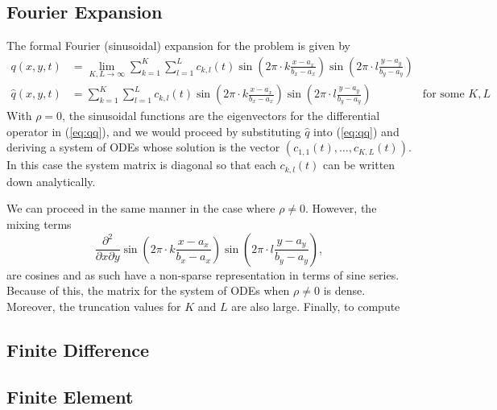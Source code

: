 \documentclass[10pt]{article}
\begin{document}
\subsection{Fourier Expansion}
The formal Fourier (sinusoidal) expansion for the problem is given by
\begin{align*}
  q(x,y,t) &= \lim_{K,L\to\infty}\sum_{k=1}^K \sum_{l=1}^L c_{k,l}(t) \sin\left(2\pi\cdot k \frac{x-a_x}{b_x-a_x}\right) \sin\left(2\pi\cdot l \frac{y-a_y}{b_y-a_y}\right) \\
  \hat{q}(x,y,t) &= \sum_{k=1}^K \sum_{l=1}^L c_{k,l}(t) \sin\left(2\pi\cdot k \frac{x-a_x}{b_x-a_x}\right) \sin\left(2\pi\cdot l \frac{y-a_y}{b_y-a_y}\right) & \mbox{for some } K, L
\end{align*}
With $\rho = 0$, the sinusoidal functions are the eigenvectors for the
differential operator in (\ref{eq:qq}), and we would proceed by
substituting $\hat{q}$ into (\ref{eq:qq}) and deriving a system of
ODEs whose solution is the vector $(c_{1,1}(t), \ldots,
c_{K,L}(t))$. In this case the system matrix is diagonal so that each
$c_{k,l}(t)$ can be written down analytically.

We can proceed in the same manner in the case where $\rho \neq
0$. However, the mixing terms
\[
  \frac{\partial^2}{\partial x \partial y} \sin\left(2\pi\cdot k
    \frac{x-a_x}{b_x-a_x}\right) \sin\left(2\pi\cdot l
    \frac{y-a_y}{b_y-a_y}\right),
\]
are cosines and as such have a non-sparse representation in terms of
sine series. Because of this, the matrix for the system of ODEs when
$\rho \neq 0$ is dense. Moreover, the truncation values for $K$ and
$L$ are also large. Finally, to compute 
\subsection{Finite Difference}


\subsection{Finite Element}




\end{document}
